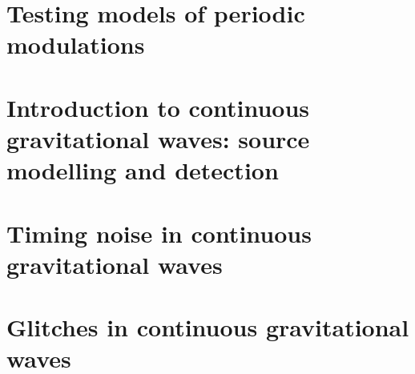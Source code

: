 \documentclass[twoside]{ecsthesis}
\begin{document}
\chapter{Testing models of periodic modulations}

\chapter{Introduction to continuous gravitational waves: source modelling and detection}

\chapter{Timing noise in continuous gravitational waves}

\chapter{Glitches in continuous gravitational waves}



\end{document}
